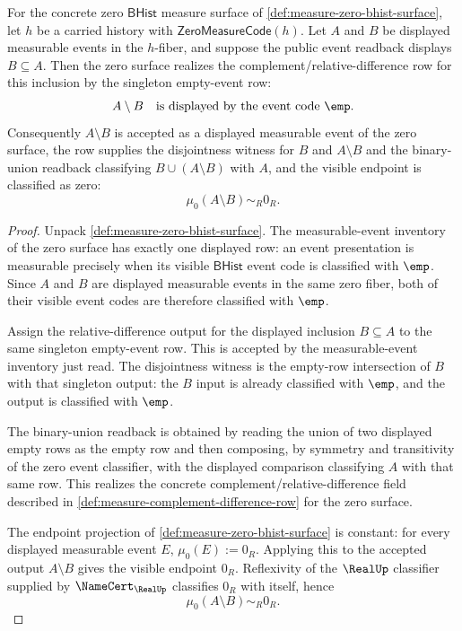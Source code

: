 \begin{theorem}
\label{thm:measure-zero-bhist-relative-difference-zero-row}
For the concrete zero $\mathsf{BHist}$ measure surface of
\autoref{def:measure-zero-bhist-surface}, let $h$ be a carried history with
$\mathsf{ZeroMeasureCode}(h)$. Let $A$ and $B$ be displayed measurable events
in the $h$-fiber, and suppose the public event readback displays
$B\subseteq A$. Then the zero surface realizes the
complement/relative-difference row for this inclusion by the singleton
empty-event row:
$$
A\setminus B\quad\text{is displayed by the event code }\emp.
$$
Consequently $A\setminus B$ is accepted as a displayed measurable event of the
zero surface, the row supplies the disjointness witness for $B$ and
$A\setminus B$ and the binary-union readback classifying
$B\cup(A\setminus B)$ with $A$, and the visible endpoint is classified as
zero:
$$
\mu_0(A\setminus B)\sim_R0_R.
$$
\end{theorem}
\begin{proof}
Unpack \autoref{def:measure-zero-bhist-surface}. The measurable-event inventory
of the zero surface has exactly one displayed row: an event presentation is
measurable precisely when its visible $\mathsf{BHist}$ event code is
classified with $\emp$. Since $A$ and $B$ are displayed measurable events in
the same zero fiber, both of their visible event codes are therefore classified
with $\emp$.

Assign the relative-difference output for the displayed inclusion
$B\subseteq A$ to the same singleton empty-event row. This is accepted by the
measurable-event inventory just read. The disjointness witness is the empty-row
intersection of $B$ with that singleton output: the $B$ input is already
classified with $\emp$, and the output is classified with $\emp$.

The binary-union readback is obtained by reading the union of two displayed
empty rows as the empty row and then composing, by symmetry and transitivity of
the zero event classifier, with the displayed comparison classifying $A$ with
that same row. This realizes the concrete complement/relative-difference field
described in \autoref{def:measure-complement-difference-row} for the zero
surface.

The endpoint projection of \autoref{def:measure-zero-bhist-surface} is
constant: for every displayed measurable event $E$, $\mu_0(E):=0_R$. Applying
this to the accepted output $A\setminus B$ gives the visible endpoint $0_R$.
Reflexivity of the $\RealUp$ classifier supplied by $\NameCert_{\RealUp}$
classifies $0_R$ with itself, hence
$$
\mu_0(A\setminus B)\sim_R0_R.
$$
\end{proof}
